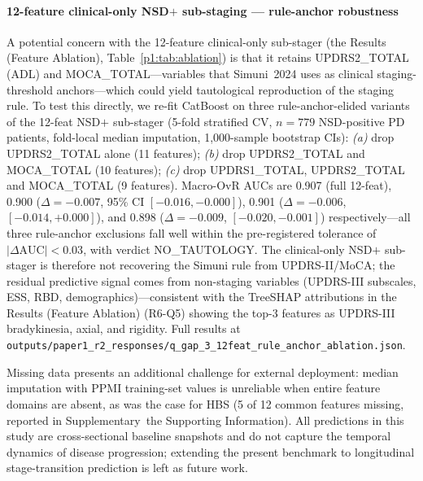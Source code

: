 \documentclass[10pt,letterpaper]{article}
\begin{document}
\paragraph*{12-feature clinical-only NSD$+$ sub-staging --- rule-anchor robustness} A potential concern with the 12-feature clinical-only sub-stager (the Results (Feature Ablation), Table~\ref{p1:tab:ablation}) is that it retains UPDRS2\_TOTAL (ADL) and MOCA\_TOTAL---variables that Simuni~2024 uses as clinical staging-threshold anchors---which could yield tautological reproduction of the staging rule. To test this directly, we re-fit CatBoost on three rule-anchor-elided variants of the 12-feat NSD$+$ sub-stager (5-fold stratified CV, $n{=}779$ NSD-positive PD patients, fold-local median imputation, 1{,}000-sample bootstrap CIs): \emph{(a)} drop UPDRS2\_TOTAL alone (11 features); \emph{(b)} drop UPDRS2\_TOTAL and MOCA\_TOTAL (10 features); \emph{(c)} drop UPDRS1\_TOTAL, UPDRS2\_TOTAL and MOCA\_TOTAL (9 features). Macro-OvR AUCs are 0.907 (full 12-feat), 0.900 ($\Delta{=}{-}0.007$, 95\% CI $[{-}0.016, {-}0.000]$), 0.901 ($\Delta{=}{-}0.006$, $[{-}0.014, {+}0.000]$), and 0.898 ($\Delta{=}{-}0.009$, $[{-}0.020, {-}0.001]$) respectively---all three rule-anchor exclusions fall well within the pre-registered tolerance of $|\Delta\mathrm{AUC}|<0.03$, with verdict NO\_TAUTOLOGY. The clinical-only NSD$+$ sub-stager is therefore not recovering the Simuni rule from UPDRS-II/MoCA; the residual predictive signal comes from non-staging variables (UPDRS-III subscales, ESS, RBD, demographics)---consistent with the TreeSHAP attributions in the Results (Feature Ablation) (R6-Q5) showing the top-3 features as UPDRS-III bradykinesia, axial, and rigidity. Full results at \texttt{outputs/paper1\_r2\_responses/q\_gap\_3\_12feat\_rule\_anchor\_ablation.json}.

Missing data presents an additional challenge for external deployment: median imputation with PPMI training-set values is unreliable when entire feature domains are absent, as was the case for HBS (5 of 12 common features missing, reported in Supplementary~the Supporting Information). All predictions in this study are cross-sectional baseline snapshots and do not capture the temporal dynamics of disease progression; extending the present benchmark to longitudinal stage-transition prediction is left as future work.
\end{document}
